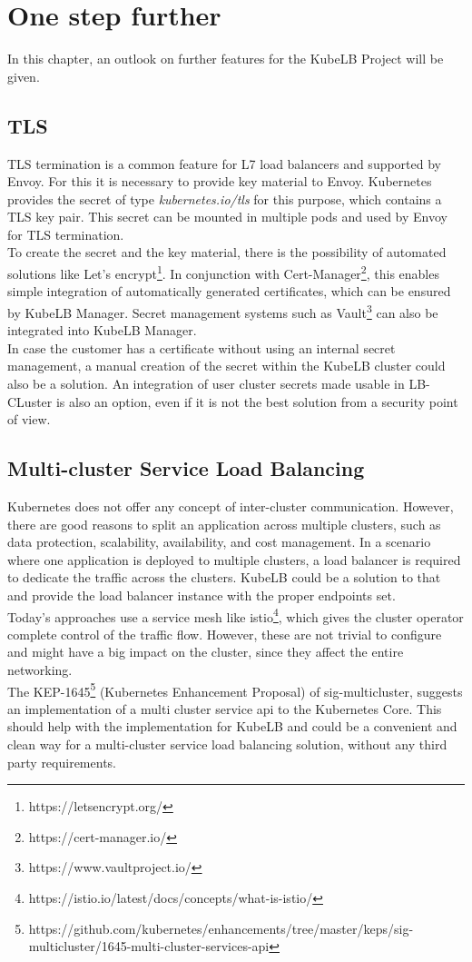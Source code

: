 \chapter{One step further}

In this chapter, an outlook on further features for the KubeLB Project will be given.

\section{TLS}

TLS termination is a common feature for L7 load balancers and supported by Envoy.
For this it is necessary to provide key material to Envoy.
Kubernetes provides the secret of type \textit{kubernetes.io/tls} for this purpose, which contains a TLS key pair.
This secret can be mounted in multiple pods and used by Envoy for TLS termination.
\\
To create the secret and the key material, there is the possibility of automated solutions like Let's encrypt\footnote{https://letsencrypt.org/}.
In conjunction with Cert-Manager\footnote{https://cert-manager.io/}, this enables simple integration of automatically generated certificates, which can be ensured by KubeLB Manager.
Secret management systems such as Vault\footnote{https://www.vaultproject.io/} can also be integrated into KubeLB Manager.
\\
In case the customer has a certificate without using an internal secret management, a manual creation of the secret within the KubeLB cluster could also be a solution.
An integration of user cluster secrets made usable in LB-CLuster is also an option, even if it is not the best solution from a security point of view.

\section{Multi-cluster Service Load Balancing}

Kubernetes does not offer any concept of inter-cluster communication.
However, there are good reasons to split an application across multiple clusters, such as data protection, scalability, availability, and cost management.
In a scenario where one application is deployed to multiple clusters, a load balancer is required to dedicate the traffic across the clusters.
KubeLB could be a solution to that and provide the load balancer instance with the proper endpoints set.
\\
Today's approaches use a service mesh like istio\footnote{https://istio.io/latest/docs/concepts/what-is-istio/}, which gives the cluster operator complete control of the traffic flow.
However, these are not trivial to configure and might have a big impact on the cluster, since they affect the entire networking.
\\
The KEP-1645\footnote{https://github.com/kubernetes/enhancements/tree/master/keps/sig-multicluster/1645-multi-cluster-services-api} (Kubernetes Enhancement Proposal) of sig-multicluster, suggests an implementation of a multi cluster service api to the Kubernetes Core.
This should help with the implementation for KubeLB and could be a convenient and clean way for a multi-cluster service load balancing solution, without any third party requirements.
